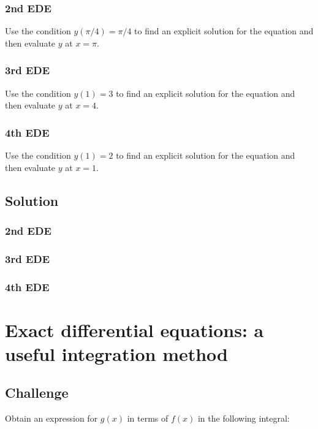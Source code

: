 \subsubsection{2nd EDE}
Use the condition $y(\pi/4)=\pi/4$ to find an explicit solution for the equation and then evaluate $y$ at $x=\pi$.

\subsubsection{3rd EDE}
Use the condition $y(1)=3$ to find an explicit solution for the equation and then evaluate $y$ at $x=4$.

\subsubsection{4th EDE}
Use the condition $y(1)=2$ to find an explicit solution for the equation and then evaluate $y$ at $x=1$.


\subsection*{Solution}

\subsubsection{2nd EDE}
\six{}


\subsubsection{3rd EDE}
\six{}


\subsubsection{4th EDE}
\six{}





\newpage
\section{Exact differential equations: a useful integration method}

\subsection*{Challenge}
Obtain an expression for $g(x)$ in terms of $f(x)$ in the following integral:

